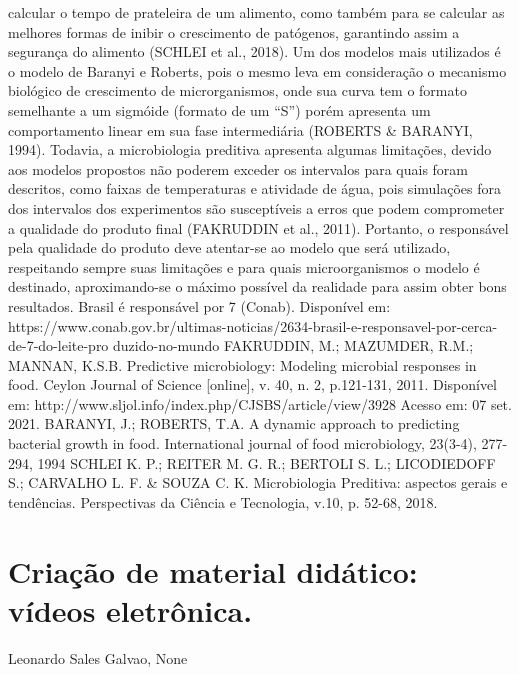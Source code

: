 calcular o tempo de prateleira de um alimento, como também para se calcular as melhores
formas de inibir o crescimento de patógenos, garantindo assim a segurança do alimento
(SCHLEI et al., 2018). Um dos modelos mais utilizados é o modelo de Baranyi e Roberts, pois o
mesmo leva em consideração o mecanismo biológico de crescimento de microrganismos, onde
sua curva tem o formato semelhante a um sigmóide (formato de um “S”) porém apresenta um
comportamento linear em sua fase intermediária (ROBERTS & BARANYI, 1994). Todavia, a
microbiologia preditiva apresenta algumas limitações, devido aos modelos propostos não
poderem exceder os intervalos para quais foram descritos, como faixas de temperaturas e
atividade de água, pois simulações fora dos intervalos dos experimentos são susceptíveis a erros
que podem comprometer a qualidade do produto final (FAKRUDDIN et al., 2011). Portanto, o
responsável pela qualidade do produto deve atentar-se ao modelo que será utilizado, respeitando
sempre suas limitações e para quais microorganismos o modelo é destinado, aproximando-se o
máximo possível da realidade para assim obter bons resultados.
Brasil é responsável por 7%
(Conab). Disponível em:
https://www.conab.gov.br/ultimas-noticias/2634-brasil-e-responsavel-por-cerca-de-7-do-leite-pro
duzido-no-mundo
FAKRUDDIN, M.; MAZUMDER, R.M.; MANNAN, K.S.B. Predictive microbiology:
Modeling microbial responses in food. Ceylon Journal of Science [online], v. 40, n. 2,
p.121-131, 2011. Disponível em: http://www.sljol.info/index.php/CJSBS/article/view/3928
Acesso em: 07 set. 2021.
BARANYI, J.; ROBERTS, T.A. A dynamic approach to predicting bacterial growth in food.
International journal of food microbiology, 23(3-4), 277-294, 1994
SCHLEI K. P.; REITER M. G. R.; BERTOLI S. L.; LICODIEDOFF S.; CARVALHO L. F. &
SOUZA C. K. Microbiologia Preditiva: aspectos gerais e tendências. Perspectivas da
Ciência e Tecnologia, v.10, p. 52-68, 2018.



\section{Criação de material didático: vídeos eletrônica.}

Leonardo Sales Galvao, None

